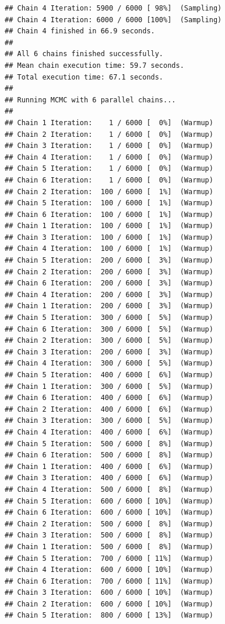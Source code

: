 \documentclass[
]{article}
\begin{document}
\begin{verbatim}
## Chain 4 Iteration: 5900 / 6000 [ 98%]  (Sampling) 
## Chain 4 Iteration: 6000 / 6000 [100%]  (Sampling) 
## Chain 4 finished in 66.9 seconds.
## 
## All 6 chains finished successfully.
## Mean chain execution time: 59.7 seconds.
## Total execution time: 67.1 seconds.
## 
## Running MCMC with 6 parallel chains...
## 
## Chain 1 Iteration:    1 / 6000 [  0%]  (Warmup) 
## Chain 2 Iteration:    1 / 6000 [  0%]  (Warmup) 
## Chain 3 Iteration:    1 / 6000 [  0%]  (Warmup) 
## Chain 4 Iteration:    1 / 6000 [  0%]  (Warmup) 
## Chain 5 Iteration:    1 / 6000 [  0%]  (Warmup) 
## Chain 6 Iteration:    1 / 6000 [  0%]  (Warmup) 
## Chain 2 Iteration:  100 / 6000 [  1%]  (Warmup) 
## Chain 5 Iteration:  100 / 6000 [  1%]  (Warmup) 
## Chain 6 Iteration:  100 / 6000 [  1%]  (Warmup) 
## Chain 1 Iteration:  100 / 6000 [  1%]  (Warmup) 
## Chain 3 Iteration:  100 / 6000 [  1%]  (Warmup) 
## Chain 4 Iteration:  100 / 6000 [  1%]  (Warmup) 
## Chain 5 Iteration:  200 / 6000 [  3%]  (Warmup) 
## Chain 2 Iteration:  200 / 6000 [  3%]  (Warmup) 
## Chain 6 Iteration:  200 / 6000 [  3%]  (Warmup) 
## Chain 4 Iteration:  200 / 6000 [  3%]  (Warmup) 
## Chain 1 Iteration:  200 / 6000 [  3%]  (Warmup) 
## Chain 5 Iteration:  300 / 6000 [  5%]  (Warmup) 
## Chain 6 Iteration:  300 / 6000 [  5%]  (Warmup) 
## Chain 2 Iteration:  300 / 6000 [  5%]  (Warmup) 
## Chain 3 Iteration:  200 / 6000 [  3%]  (Warmup) 
## Chain 4 Iteration:  300 / 6000 [  5%]  (Warmup) 
## Chain 5 Iteration:  400 / 6000 [  6%]  (Warmup) 
## Chain 1 Iteration:  300 / 6000 [  5%]  (Warmup) 
## Chain 6 Iteration:  400 / 6000 [  6%]  (Warmup) 
## Chain 2 Iteration:  400 / 6000 [  6%]  (Warmup) 
## Chain 3 Iteration:  300 / 6000 [  5%]  (Warmup) 
## Chain 4 Iteration:  400 / 6000 [  6%]  (Warmup) 
## Chain 5 Iteration:  500 / 6000 [  8%]  (Warmup) 
## Chain 6 Iteration:  500 / 6000 [  8%]  (Warmup) 
## Chain 1 Iteration:  400 / 6000 [  6%]  (Warmup) 
## Chain 3 Iteration:  400 / 6000 [  6%]  (Warmup) 
## Chain 4 Iteration:  500 / 6000 [  8%]  (Warmup) 
## Chain 5 Iteration:  600 / 6000 [ 10%]  (Warmup) 
## Chain 6 Iteration:  600 / 6000 [ 10%]  (Warmup) 
## Chain 2 Iteration:  500 / 6000 [  8%]  (Warmup) 
## Chain 3 Iteration:  500 / 6000 [  8%]  (Warmup) 
## Chain 1 Iteration:  500 / 6000 [  8%]  (Warmup) 
## Chain 5 Iteration:  700 / 6000 [ 11%]  (Warmup) 
## Chain 4 Iteration:  600 / 6000 [ 10%]  (Warmup) 
## Chain 6 Iteration:  700 / 6000 [ 11%]  (Warmup) 
## Chain 3 Iteration:  600 / 6000 [ 10%]  (Warmup) 
## Chain 2 Iteration:  600 / 6000 [ 10%]  (Warmup) 
## Chain 5 Iteration:  800 / 6000 [ 13%]  (Warmup) 

\end{verbatim}
\end{document}
